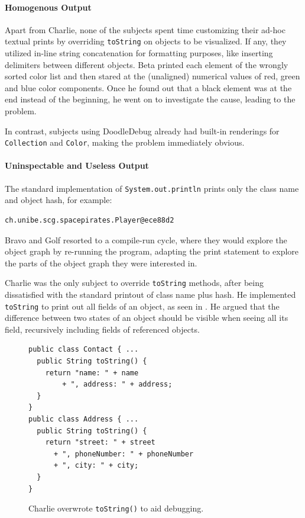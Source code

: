 \documentclass[english]{scrartcl}
\newcommand{\DD}{Dood\-le\-De\-bug\xspace}
\newcommand{\println}{\texttt{Sys\-tem.\-out.\-println}\xspace}
\begin{document}
\paragraph{Homogenous Output}
Apart from Charlie, none of the subjects spent time customizing their ad-hoc textual prints by overriding \texttt{toString} on objects to be visualized.
If any, they utilized in-line string concatenation for formatting purposes, like inserting delimiters between different objects.
Beta printed each element of the wrongly sorted color list and then stared at the (unaligned) numerical values of red, green and blue color components.
Once he found out that a black element was at the end instead of the beginning, he went on to investigate the cause, leading to the problem.

In contrast, subjects using \DD already had built-in renderings for \texttt{Collection}  and \texttt{Color}, making the problem immediately obvious.

\paragraph{Uninspectable and Useless Output}
The standard implementation of \println prints only the class name and object hash, for example:
\begin{lstlisting}
ch.unibe.scg.spacepirates.Player@ece88d2
\end{lstlisting}
Bravo and Golf resorted to a compile-run cycle, where they would explore the object graph by re-running the program, adapting the print statement to explore the parts of the object graph they were interested in.

Charlie was the only subject to override \texttt{toString} methods, after being dissatisfied with the standard printout of class name plus hash. He implemented \texttt{toString}  to print out all fields of an object, as seen in .
He argued that the difference between two states of an object should be visible when seeing all its field, recursively including fields of referenced objects.

\begin{figure}[h]
\begin{lstlisting}
public class Contact { ...
  public String toString() {
	return "name: " + name
		+ ", address: " + address;
  }
}
public class Address { ...
  public String toString() {
	return "street: " + street
	  + ", phoneNumber: " + phoneNumber
	  + ", city: " + city;
  }
}
\end{lstlisting}
  \caption{Charlie overwrote \texttt{toString()} to aid debugging.}
\end{figure}
\end{document}
